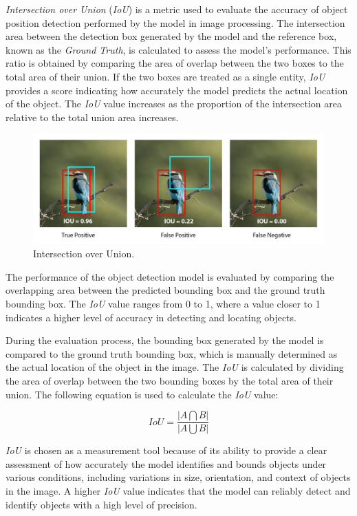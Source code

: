 \emph{Intersection over Union} (\emph{IoU}) is a metric used to evaluate the accuracy of object position detection performed by the model in image processing. The intersection area between the detection box generated by the model and the reference box, known as the \emph{Ground Truth}, is calculated to assess the model's performance. This ratio is obtained by comparing the area of overlap between the two boxes to the total area of their union. If the two boxes are treated as a single entity, \emph{IoU} provides a score indicating how accurately the model predicts the actual location of the object. The \emph{IoU} value increases as the proportion of the intersection area relative to the total union area increases.

\begin{figure}[H]
  \centering
  \includegraphics[scale=0.15]{gambar/IoU bbox.jpg}
  \caption{Intersection over Union.}
  \label{fig:IoU_bbox}
\end{figure}

The performance of the object detection model is evaluated by comparing the overlapping area between the predicted bounding box and the ground truth bounding box. The \emph{IoU} value ranges from 0 to 1, where a value closer to 1 indicates a higher level of accuracy in detecting and locating objects.

During the evaluation process, the bounding box generated by the model is compared to the ground truth bounding box, which is manually determined as the actual location of the object in the image. The \emph{IoU} is calculated by dividing the area of overlap between the two bounding boxes by the total area of their union. The following equation is used to calculate the \emph{IoU} value:

\begin{equation}
  IoU = \frac{\left |A \bigcap B \right |}{\left | A \bigcup B \right |}
\end{equation}

\emph{IoU} is chosen as a measurement tool because of its ability to provide a clear assessment of how accurately the model identifies and bounds objects under various conditions, including variations in size, orientation, and context of objects in the image. A higher \emph{IoU} value indicates that the model can reliably detect and identify objects with a high level of precision.

